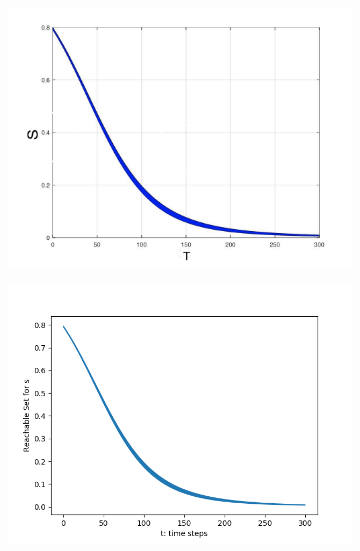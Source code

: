 \documentclass[EPiC]{easychair}
\begin{document}
\begin{figure}[h]
    \hspace{-15ex}
    \begin{subfigure}{0.6\textwidth}
    \centering
    \includegraphics[width=\textwidth]{SapoFigures/SIR/SapoSIR_S.jpg}
    \end{subfigure}
    \begin{subfigure}{0.6\textwidth}
    \centering
    \includegraphics[width=1.2\textwidth]{SapoFigures/SIR/KaaSIR_S.png}
    \end{subfigure}
 

\end{figure}
\end{document}
